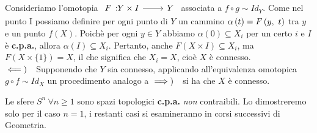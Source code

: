 \begin{demonstration}
\begin{enumerate}[label=\Roman*]
Consideriamo l'omotopia $\funz{F}{Y\times I}{Y}$ associata a $f\circ g\sim Id_Y$. Come nel punto I possiamo definire per ogni punto di $Y$ un cammino $\alpha\left(t\right)=F\left(y,\ t\right)$ tra $y$ e un punto $f\left(X\right)$. Poichè per ogni $y\in Y$ abbiamo $\alpha\left(0\right)\subseteq X_i$ per un certo $i$ e $I$ è \textbf{c.p.a.}, allora $\alpha\left(I\right)\subseteq X_i$. Pertanto, anche $F\left(X\times I\right)\subseteq X_i$, ma $F\left(X\times\{1\}\right)=X$, il che significa che $X_i=X$, cioè $X$ è connesso.\\ 
$\impliedby)\quad$Supponendo che $Y$ sia connesso, applicando all'equivalenza omotopica $g\circ f\sim Id_X$ un procedimento analogo a $\implies)\quad$si ha che $X$ è connesso.
\end{enumerate}
\vspace{-6mm}
	\end{demonstration}
\begin{example}
	Le sfere $S^n\ \forall n\geq 1$ sono spazi topologici \textbf{c.p.a.} \textit{non} contraibili. Lo dimostreremo solo per il caso $n=1$, i restanti casi si esamineranno in corsi successivi di Geometria.
\end{example}
